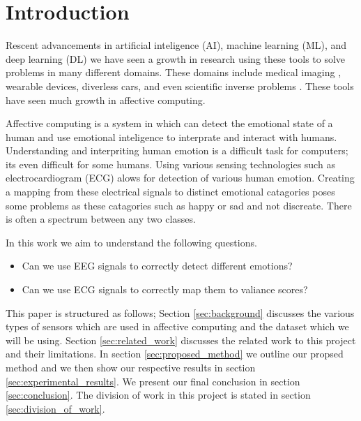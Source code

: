 \section{Introduction}
Rescent advancements in
artificial inteligence (AI),
machine learning (ML),
and deep learning (DL)
we have seen a growth in
research using these tools to
solve problems in many different domains.
These domains include medical imaging \cite{Greenspan:2016},
wearable devices,
diverless cars,
and even scientific inverse problems \cite{laanait2019exascale}.
These tools have seen much growth in affective computing.

Affective computing is a system in which can detect the
emotional state of a human and use emotional inteligence
to interprate and interact with humans.
Understanding and interpriting human emotion is a
difficult task for computers;
its even difficult for some humans.
Using various sensing technologies such as electrocardiogram (ECG)
alows for detection of various human emotion.
Creating a mapping from these electrical signals to
distinct emotional catagories poses some problems as
these catagories such as happy or sad and not discreate.
There is often a spectrum between any two classes.

In this work we aim to understand the following questions.
\begin{itemize}
    \item Can we use EEG signals to correctly detect different emotions?
    \item Can we use ECG signals to correctly map them to valiance scores?
\end{itemize}

This paper is structured as follows;
Section \ref{sec:background} discusses the various types of sensors
which are used in affective computing and the dataset which we will be using.
%
Section \ref{sec:related_work} discusses the related work to this project
and their limitations.
%
In section \ref{sec:proposed_method} we outline our propsed method
and we then show our respective results in section \ref{sec:experimental_results}.
%
We present our final conclusion in section \ref{sec:conclusion}.
%
The division of work in this project is stated in section
\ref{sec:division_of_work}.
